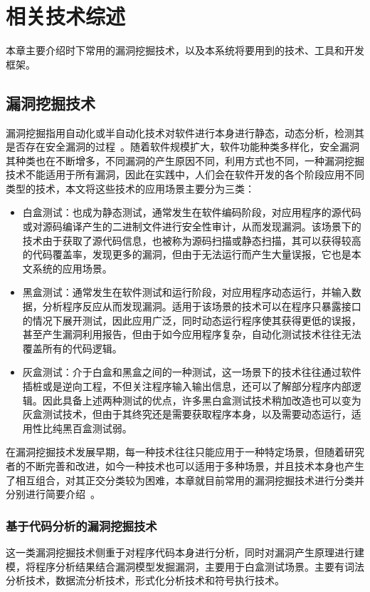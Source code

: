 \chapter{相关技术综述}
本章主要介绍时下常用的漏洞挖掘技术，以及本系统将要用到的技术、工具和开发框架。

\section{漏洞挖掘技术}
漏洞挖掘指用自动化或半自动化技术对软件进行本身进行静态，动态分析，检测其是否存在安全漏洞的过程~\cite{liujian2018}。随着软件规模扩大，软件功能种类多样化，安全漏洞其种类也在不断增多，不同漏洞的产生原因不同，利用方式也不同，一种漏洞挖掘技术不能适用于所有漏洞，因此在实践中，人们会在软件开发的各个阶段应用不同类型的技术，本文将这些技术的应用场景主要分为三类：
\begin{itemize}
    \item  白盒测试：也成为静态测试，通常发生在软件编码阶段，对应用程序的源代码或对源码编译产生的二进制文件进行安全性审计，从而发现漏洞。该场景下的技术由于获取了源代码信息，也被称为源码扫描或静态扫描，其可以获得较高的代码覆盖率，发现更多的漏洞，但由于无法运行而产生大量误报，它也是本文系统的应用场景。
    \item 黑盒测试：通常发生在软件测试和运行阶段，对应用程序动态运行，并输入数据，分析程序反应从而发现漏洞。适用于该场景的技术可以在程序只暴露接口的情况下展开测试，因此应用广泛，同时动态运行程序使其获得更低的误报，甚至产生漏洞利用报告，但由于如今应用程序复杂，自动化测试技术往往无法覆盖所有的代码逻辑。
    \item 灰盒测试：介于白盒和黑盒之间的一种测试，这一场景下的技术往往通过软件插桩或是逆向工程，不但关注程序输入输出信息，还可以了解部分程序内部逻辑。因此具备上述两种测试的优点，许多黑白盒测试技术稍加改造也可以变为灰盒测试技术，但由于其终究还是需要获取程序本身，以及需要动态运行，适用性比纯黑百盒测试弱。
\end{itemize}

在漏洞挖掘技术发展早期，每一种技术往往只能应用于一种特定场景，但随着研究者的不断完善和改进，如今一种技术也可以适用于多种场景，并且技术本身也产生了相互组合，对其正交分类较为困难，本章就目前常用的漏洞挖掘技术进行分类并分别进行简要介绍~\cite{liujian2018,meihong2009}。


\subsection{基于代码分析的漏洞挖掘技术}
这一类漏洞挖掘技术侧重于对程序代码本身进行分析，同时对漏洞产生原理进行建模，将程序分析结果结合漏洞模型发掘漏洞，主要用于白盒测试场景。主要有词法分析技术，数据流分析技术，形式化分析技术和符号执行技术。\\
\vspace{1cm}

